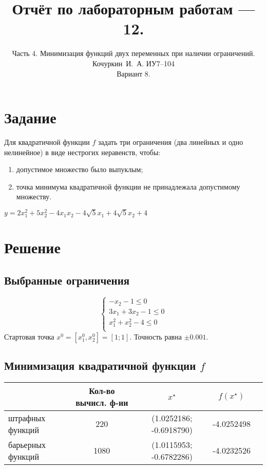 \documentclass[a4paper,12pt]{article}
\title{Отчёт по лабораторным работам \textnumero 11 --- 12.}
\author{Часть 4. Минимизация функций двух переменных при наличии ограничений. \\ Кочуркин~И.~А. ИУ7--104 \\ Вариант 8.}
\begin{document}
\maketitle

\section{Задание}
Для квадратичной функции $f$ задать три ограничения (два линейных и одно нелинейное) в виде нестрогих неравенств, чтобы:
\begin{enumerate}
\item допустимое множество было выпуклым;
\item точка минимума квадратичной функции не принадлежала допустимому множеству.
\end{enumerate}

$y = 2 x_1^2 + 5 x_2^2 - 4 x_1 x_2 - 4\sqrt{5} x_1 + 4 \sqrt{5} x_2 + 4$

\section{Решение}

\subsection{Выбранные ограничения}
\[
\left\{ 
\begin{array}{l}
  -x_2 - 1 \leq 0 \\
  3 x_1 + 3 x_2 - 1 \leq 0 \\
  x_1^2 + x_2^2 - 4 \leq 0 \\
\end{array} \right.
\]
Стартовая точка $x^0  = [x^0_1, x^0_2] = [1; 1]$. Точность равна $\pm0.001$.



\subsection{Минимизация квадратичной функции $f$}
\begin{table}[!ht]
  \begin{tabular}{|p{45mm}|c|c|c|c|}
  \hline
  \centering{Метод} & Кол-во вычисл. ф-ии & $x^{\star}$ & $f(x^{\star})$ \\
  \hline
  штрафных функций & 220 & (1.0252186; -0.6918790) & -4.0252498 \\
  \hline
  барьерных функций & 1080 & (1.0115953; -0.6782286) & -4.0232526 \\
  \hline
  \end{tabular}
\end{table}
\end{document}
